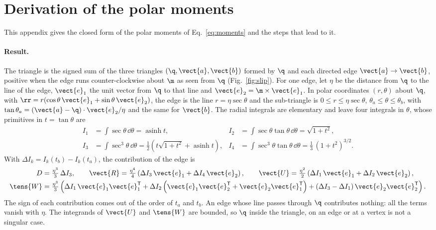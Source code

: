 \section{Derivation of the polar moments}\label{app:polar}

This appendix gives the closed form of the polar moments of Eq.~\eqref{eq:moments} and the
steps that lead to it.

\paragraph{Result.} The triangle is the signed sum of the three triangles
$(\q, \vect{a}, \vect{b})$ formed by $\q$ and each directed edge $\vect{a}\to\vect{b}$, positive
when the edge runs counter-clockwise about $\m$ as seen from $\q$ (Fig.~\ref{fig:slip}). For one
edge, let $\eta$ be the distance from $\q$ to the line of the edge, $\vect{e}_1$ the unit vector
from $\q$ to that line and $\vect{e}_2 = \m\times\vect{e}_1$. In polar coordinates
$(r, \theta)$ about $\q$, with $\rr = r(\cos\theta\,\vect{e}_1 + \sin\theta\,\vect{e}_2)$, the
edge is the line $r = \eta\sec\theta$ and the sub-triangle is $0\le r\le \eta\sec\theta$,
$\theta_a\le\theta\le\theta_b$, with $\tan\theta_a = (\vect{a}-\q)\cdot\vect{e}_2/\eta$ and the
same for $\vect{b}$. The radial integrals are elementary and leave four integrals in $\theta$,
whose primitives in $t = \tan\theta$ are
\begin{equation}
\begin{aligned}
  I_1 &= \int\sec\theta\,\dd\theta = \operatorname{asinh} t, &
  I_2 &= \int\sec\theta\tan\theta\,\dd\theta = \sqrt{1+t^2},\\
  I_3 &= \int\sec^3\theta\,\dd\theta = \tfrac12\left(t\sqrt{1+t^2} + \operatorname{asinh} t\right), &
  I_4 &= \int\sec^3\theta\tan\theta\,\dd\theta = \tfrac13\,(1+t^2)^{3/2} .
\end{aligned}
\label{eq:primitives}
\end{equation}
With $\Delta I_k = I_k(t_b) - I_k(t_a)$, the contribution of the edge is
\begin{equation}
\begin{aligned}
  D &= \tfrac{\eta^3}{3}\,\Delta I_3, \qquad
  \vect{R} = \tfrac{\eta^4}{4}\left(\Delta I_3\,\vect{e}_1 + \Delta I_4\,\vect{e}_2\right), \qquad
  \vect{U} = \tfrac{\eta^2}{2}\left(\Delta I_1\,\vect{e}_1 + \Delta I_2\,\vect{e}_2\right),\\
  \tens{W} &= \tfrac{\eta^3}{3}\left(\Delta I_1\,\vect{e}_1\vect{e}_1^{\mathsf T}
     + \Delta I_2\left(\vect{e}_1\vect{e}_2^{\mathsf T} + \vect{e}_2\vect{e}_1^{\mathsf T}\right)
     + (\Delta I_3 - \Delta I_1)\,\vect{e}_2\vect{e}_2^{\mathsf T}\right).
\end{aligned}
\label{eq:edge}
\end{equation}
The sign of each contribution comes out of the order of $t_a$ and $t_b$. An edge whose line
passes through $\q$ contributes nothing: all the terms vanish with $\eta$. The integrands of
$\vect{U}$ and $\tens{W}$ are bounded, so $\q$ inside the triangle, on an edge or at a vertex is
not a singular case.

